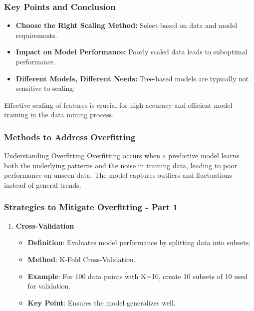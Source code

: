 \documentclass[aspectratio=169]{beamer}
\begin{document}
\begin{frame}[fragile]
    \frametitle{Key Points and Conclusion}
    \begin{itemize}
        \item \textbf{Choose the Right Scaling Method:} Select based on data and model requirements.
        \item \textbf{Impact on Model Performance:} Poorly scaled data leads to suboptimal performance.
        \item \textbf{Different Models, Different Needs:} Tree-based models are typically not sensitive to scaling.
    \end{itemize}
    Effective scaling of features is crucial for high accuracy and efficient model training in the data mining process.
\end{frame}

\begin{frame}[fragile]
    \frametitle{Methods to Address Overfitting}
    \begin{block}{Understanding Overfitting}
        Overfitting occurs when a predictive model learns both the underlying patterns and the noise in training data, leading to poor performance on unseen data. The model captures outliers and fluctuations instead of general trends.
    \end{block}
\end{frame}

\begin{frame}[fragile]
    \frametitle{Strategies to Mitigate Overfitting - Part 1}
    \begin{enumerate}
        \item \textbf{Cross-Validation}
            \begin{itemize}
                \item \textbf{Definition}: Evaluates model performance by splitting data into subsets.
                \item \textbf{Method}: K-Fold Cross-Validation.
                \item \textbf{Example}: For 100 data points with K=10, create 10 subsets of 10 used for validation.
                \item \textbf{Key Point}: Ensures the model generalizes well.
            \end{itemize}
    \end{enumerate}
\end{frame}
\end{document}
